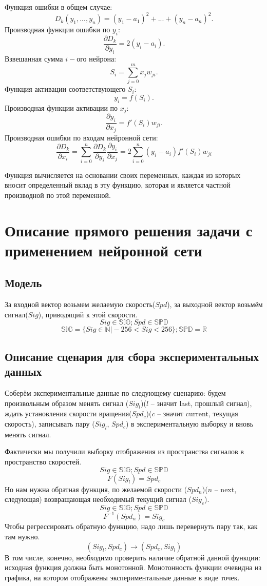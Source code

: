 \documentclass[14pt]{extreport}
\begin{document}
        Функция ошибки в общем случае:
            $$D_k(y_1,...,y_n)=(y_1-a_1)^2+...+(y_n-a_n)^2.$$
        Производная функции ошибки по $y_i$:
            $$\frac{\partial{D_k}}{\partial{y_i}}=2(y_i-a_i).$$
        Взвешанная сумма $i-$ого нейрона:
            $$S_i=\sum_{j=0}^{m}x_j w_{ji}.$$
        Функция активации соответствующего $S_i$:
            $$y_i=f(S_i).$$
        Производная функции активации по $x_j$:
            $$\frac{\partial{y_i}}{\partial{x_j}}={f'(S_i)w_{ji}}.$$
        Производная ошибки по входам нейронной сети:
            $$\frac{\partial{D_k}}{\partial {x_i}}=\sum_{i=0}^{n}\frac{\partial{D_k}}{\partial {y_i}}\frac{\partial{y_i}}{\partial {x_j}} = 2\sum_{i=0}^{n}(y_i-a_i)f'(S_i)w_{ji}$$

    Функция вычисляется на основании своих переменных, каждая из которых вносит определенный вклад в эту функцию, которая и является частной производной по этой переменной.
\newpage
    \chapter{Описание прямого решения задачи с применением нейронной сети}
            \section{Модель}
                За входной вектор возьмем желаемую скорость($Spd$), за выходной вектор возьмём сигнал($Sig$), приводящий к этой скорости.
                \[Sig \in \mathbb{SIG}; Spd \in \mathbb{SPD}\]
                \[\mathbb{SIG} = \{Sig \in \mathbb{N}\vert -256 < Sig < 256\}; \mathbb{SPD} = \mathbb{R}\]
            \section{Описание сценария для сбора экспериментальных данных}
                Соберём экспериментальные данные по следующему сценарию: будем произвольным образом менять сигнал ($Sig_l$)($l$ -- значит last, прошлый сигнал), ждать установления скорости вращения($Spd_c$)($c$ -- значит current, текущая скорость), записывать пару ($Sig_l$, $Spd_c$) в экспериментальную выборку и вновь менять сигнал.

                Фактически мы получили выборку отображения из пространства сигналов в пространство скоростей.
                \[Sig \in \mathbb{SIG}; Spd \in \mathbb{SPD}\]
                \[F(Sig_l) = Spd_c\]
                Но нам нужна обратная функция, по желаемой скорости ($Spd_n$)($n$ -- next, следующая) возвращающая необходимый текущий сигнал ($Sig_c$).
                \[Sig \in \mathbb{SIG}; Spd \in \mathbb{SPD}\]
                \[F^{-1}(Spd_n) = Sig_c\]
                Чтобы регрессировать обратную функцию, надо лишь перевернуть пару так, как там нужно.
                \[(Sig_l, Spd_c) \rightarrow (Spd_c, Sig_l)\]
                В том числе, конечно, необходимо проверить наличие обратной данной функции: исходная функция должна быть монотонной. Монотонность функции очевидна из графика, на котором отображены экспериментальные данные в виде точек.
\end{document}
